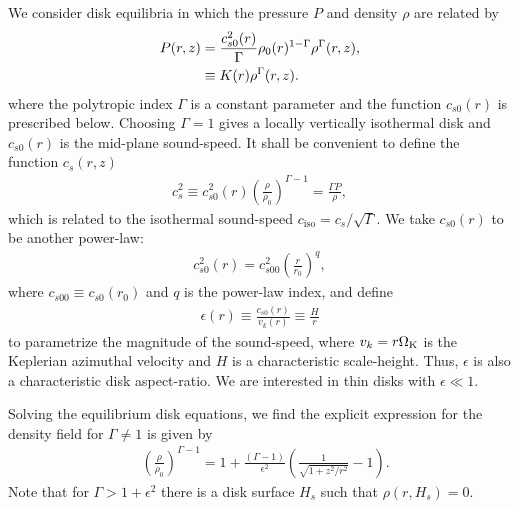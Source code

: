 We consider disk equilibria in which the pressure $P$ and density
$\rho$ are related by   
\begin{align}
  P(r,z) &= 
  \frac{c_{s0}^2(r)}{\Gamma}\rho_0(r)^{1-\Gamma}\rho^\Gamma(r,z),\notag\\
  & \equiv K(r)\rho^{\Gamma}(r,z). \label{eqm_press}
\end{align}
where the polytropic index $\Gamma$ is a  constant parameter  and the
function $c_{s0}(r)$ is prescribed below. Choosing $\Gamma=1$ gives  a 
locally vertically isothermal disk and $c_{s0}(r)$ is the mid-plane
sound-speed. 
It shall be convenient to define the function $c_s(r,z)$ 
\begin{align}
  c_s^2\equiv %
  c_{s0}^2(r)\left(\frac{\rho}{\rho_0}\right)^{\Gamma-1} =
  \frac{\Gamma P}{\rho}, 
\end{align}
which is related to the isothermal sound-speed $c_\mathrm{iso} =
c_s/\sqrt{\Gamma}$. We take $c_{s0}(r)$ to be another power-law:  
\begin{align}
  c_{s0}^2(r)=c_{s00}^2\left(\frac{r}{r_0}\right)^q, 
\end{align}
where $c_{s00}\equiv c_{s0}(r_0)$  and $q$ is the power-law index, and
define   
\begin{align}
  \epsilon(r) \equiv \frac{c_{s0}(r)}{v_k(r)} \equiv
  \frac{H}{r} 
\end{align}
to parametrize the magnitude of the sound-speed, where
$v_k=r\Omega_{\rm K}$ is the Keplerian azimuthal velocity and
$H$ is a characteristic scale-height.  Thus, $\epsilon$
is also a characteristic disk aspect-ratio. We are 
interested in thin disks with $\epsilon \ll 1$.%




Solving the equilibrium disk equations, we find the explicit
expression for the density field for 
$\Gamma\neq1$ is given  by
\begin{align}\label{eqm_dens}
  &\left(\frac{\rho}{\rho_0}\right)^{\Gamma-1} = 1 +
  \frac{\left(\Gamma-1\right)}{\epsilon^2}\left(\frac{1}{\sqrt{1+z^2/r^2}}-1\right).
\end{align}
Note that for $\Gamma > 1 + \epsilon^2$ there is a disk surface $H_s$
such that $\rho(r,H_s)=0$. 

